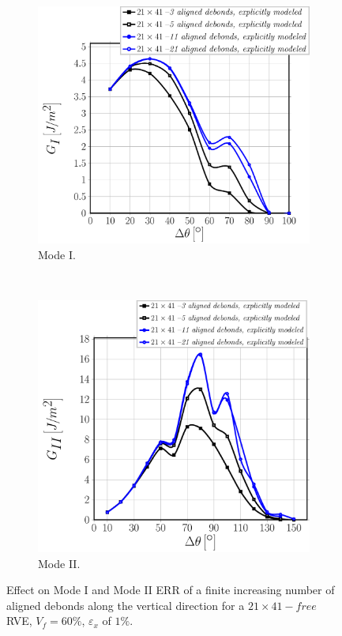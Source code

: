 \documentclass[smallextended]{svjour3}       %
\begin{document}
\begin{figure}[!h]
\centering
    \begin{subfigure}[b]{0.475\textwidth}
        \includegraphics[width=\textwidth]{symm-explicitmodel-increasing-vf60-GI.pdf}
        \caption{Mode I.}\label{subfig:finitedebsalternatingGI}
    \end{subfigure} ~
    \begin{subfigure}[b]{0.475\textwidth}
        \includegraphics[width=\textwidth]{symm-explicitmodel-increasing-vf60-GII.pdf}
        \caption{Mode II.}\label{subfig:finitedebsalignedGII}
    \end{subfigure}

\caption{Effect on Mode I and Mode II ERR of a finite increasing number of aligned debonds along the vertical direction for a $21\times41-free$ RVE, $V_{f}=60\%$, $\varepsilon_{x}$ of $1\%$.}\label{fig:finitedebsaligned}
\end{figure}
\end{document}
